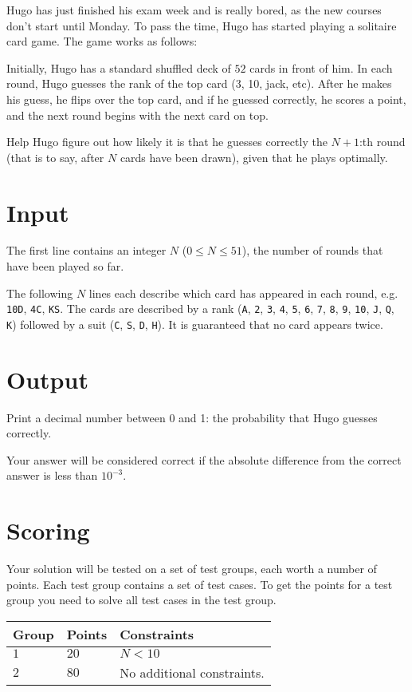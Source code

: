 Hugo has just finished his exam week and is really bored, as the new courses don't start until Monday.
To pass the time, Hugo has started playing a solitaire card game. The game works as follows:

Initially, Hugo has a standard shuffled deck of $52$ cards in front of him. In each round, Hugo guesses the rank of the top card (3, 10, jack, etc).
After he makes his guess, he flips over the top card, and if he guessed correctly, he scores a point, and the next round begins with the next card on top.

Help Hugo figure out how likely it is that he guesses correctly the $N+1$:th round (that is to say, after $N$ cards have been drawn),
given that he plays optimally.

\section*{Input}
The first line contains an integer $N$ ($0 \le N \le 51$), the number of rounds that have been played so far.

The following $N$ lines each describe which card has appeared in each round, e.g. \texttt{10D}, \texttt{4C}, \texttt{KS}.
The cards are described by a rank (\texttt{A}, \texttt{2}, \texttt{3}, \texttt{4}, \texttt{5}, \texttt{6}, \texttt{7}, \texttt{8},
\texttt{9}, \texttt{10}, \texttt{J}, \texttt{Q}, \texttt{K}) followed by a suit (\texttt{C}, \texttt{S}, \texttt{D}, \texttt{H}).
It is guaranteed that no card appears twice.

\section*{Output}
Print a decimal number between 0 and 1: the probability that Hugo guesses correctly.

Your answer will be considered correct if the absolute difference from the correct answer is less than $10^{-3}$.


\section*{Scoring}
Your solution will be tested on a set of test groups, each worth a number of points. Each test group contains
a set of test cases. To get the points for a test group you need to solve all test cases in the test group.

\noindent
\begin{tabular}{| l | l | p{12cm} |}
  \hline
  \textbf{Group} & \textbf{Points} & \textbf{Constraints} \\ \hline
  $1$    & $20$       & $N < 10$ \\ \hline
  $2$    & $80$       & No additional constraints. \\ \hline
\end{tabular}

